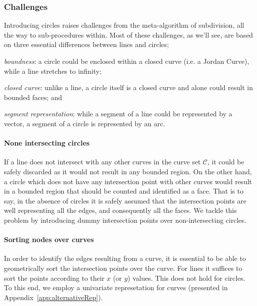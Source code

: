 \subsubsection{Challenges}

Introducing circles raises challenges from the meta-algorithm of subdivision, all the way to sub-procedures within.
Most of these challenges, as we'll see, are based on three essential differences between lines and circles;
\begin{inparaenum}
  \item \emph{boundness}: a circle could be enclosed within a closed curve (i.e. a Jordan Curve), while a line stretches to infinity;
  \item \emph{closed curve}: unlike a line, a circle itself is a closed curve and alone could result in bounded faces; and 
  \item \emph{segment representation}: while a segment of a line could be represented by a vector, a segment of a circle is represented by an arc.
\end{inparaenum}


\paragraph{None intersecting circles}
If a line does not intersect with any other curves in the curve set $\mathcal{C}$, it could be safely discarded as it would not result in any bounded region.
On the other hand, a circle which does not have any intersection point with other curves would result in a bounded region that should be counted and identified as a face.
That is to say, in the absence of circles it is safely assumed that the intersection points are well representing all the edges, and consequently all the faces.
We tackle this problem by introducing dummy intersection points over non-intersecting circles.

\paragraph{Sorting nodes over curves}
In order to identify the edges resulting from a curve, it is essential to be able to geometrically sort the intersection points over the curve.
For lines it suffices to sort the points according to their $x$ (or $y$) values.
This does not hold for circles.
To this end, we employ a univariate represetation for curves (presented in Appendix~\ref{app:alternativeRep}).


